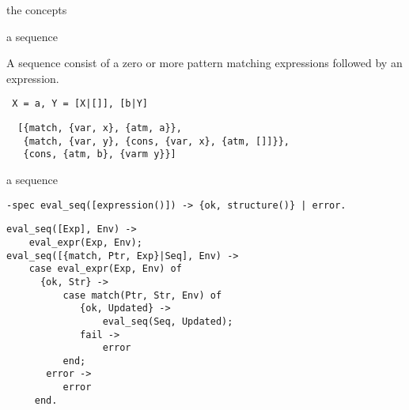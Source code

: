 \begin{frame}{the concepts}



\end{frame}

\begin{frame}[fragile]{a sequence}

A sequence consist of a zero or more pattern matching expressions followed by an expression.

\pause\vspace{20pt}

\verb+ X = a, Y = [X|[]], [b|Y]+

\pause\vspace{20pt}
\begin{verbatim}
  [{match, {var, x}, {atm, a}},
   {match, {var, y}, {cons, {var, x}, {atm, []]}},
   {cons, {atm, b}, {varm y}}]
\end{verbatim}

\end{frame}


\begin{frame}[fragile]{a sequence}

\begin{verbatim}
-spec eval_seq([expression()]) -> {ok, structure()} | error.
\end{verbatim}
\pause\vspace{20pt}

\begin{verbatim}
eval_seq([Exp], Env) ->
    eval_expr(Exp, Env);
eval_seq([{match, Ptr, Exp}|Seq], Env) ->
    case eval_expr(Exp, Env) of
      {ok, Str} ->
          case match(Ptr, Str, Env) of
             {ok, Updated} ->
                 eval_seq(Seq, Updated);
             fail ->
                 error
          end;
       error ->
          error 
     end.
\end{verbatim}

\end{frame}

